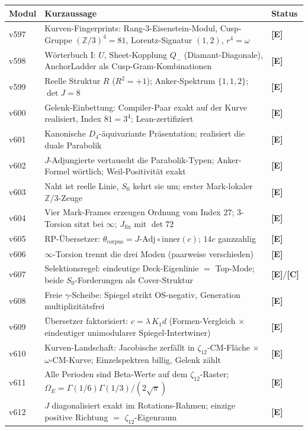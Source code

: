 \documentclass[11pt,a4paper]{article}
\newcommand{\E}{\textcolor{gut}{\textbf{[E]}}}
\newcommand{\C}{\textcolor{kern}{\textbf{[C]}}}
\begin{document}
\begingroup
\small
\setlength{\tabcolsep}{4pt}
\begin{longtable}{@{}l p{11.1cm} l@{}}
\toprule
\textbf{Modul} & \textbf{Kurzaussage} & \textbf{Status} \\
\midrule
\endhead
\bottomrule
\endfoot
v597 & Kurven-Fingerprints: Rang-3-Eisenstein-Modul, Cusp-Gruppe $(\mathbb{Z}/3)^4 = 81$, Lorentz-Signatur $(1,2)$, $r^4 = \omega$ & \E \\
v598 & Wörterbuch I: $U$, Sheet-Kopplung $Q_-$ (Diamant-Diagonale), AnchorLadder als Cusp-Gram-Kombinationen & \E \\
v599 & Reelle Struktur $R$ ($R^2 = +1$); Anker-Spektrum $\{1,1,2\}$; $\det J = 8$ & \E \\
v600 & Gelenk-Einbettung: Compiler-Paar exakt auf der Kurve realisiert, Index $81 = 3^4$; Lean-zertifiziert & \E \\
v601 & Kanonische $D_4$-äquivariante Präsentation; realisiert die duale Parabolik & \E \\
v602 & $J$-Adjungierte vertauscht die Parabolik-Typen; Anker-Formel wörtlich; Weil-Positivität exakt & \E \\
v603 & Naht ist reelle Linie, $S_0$ kehrt sie um; erster Mark-lokaler $\mathbb{Z}/3$-Zeuge & \E \\
v604 & Vier Mark-Frames erzeugen Ordnung vom Index $27$; 3-Torsion sitzt bei $\infty$; $J_{\mathrm{fix}}$ mit $\det 72$ & \E \\
v605 & RP-Übersetzer: $\theta_{\mathrm{corpus}} = J\text{-Adj} \circ \mathrm{inner}(c)$; $14c$ ganzzahlig & \E \\
v606 & $\infty$-Torsion trennt die drei Moden (paarweise verschieden) & \E \\
v607 & Selektionsregel: eindeutige Deck-Eigenlinie $=$ Top-Mode; beide $S_0$-Forderungen als Cover-Struktur & \E/\C \\
v608 & Freie $\gamma$-Scheibe: Spiegel strikt OS-negativ, Generation multiplizitätsfrei & \E \\
\midrule
v609 & Übersetzer faktorisiert: $c = \lambda\,K_1 d$ (Formen-Vergleich $\times$ eindeutiger unimodularer Spiegel-Intertwiner) & \E \\
v610 & Kurven-Landschaft: Jacobische zerfällt in $\zeta_{12}$-CM-Fläche $\times$ $\omega$-CM-Kurve; Einzelspektren billig, Gelenk zählt & \E \\
v611 & Alle Perioden sind Beta-Werte auf dem $\zeta_{12}$-Raster; $\Omega_E = \Gamma(1/6)\Gamma(1/3)/(2\sqrt{\pi})$ & \E \\
v612 & $J$ diagonalisiert exakt im Rotations-Rahmen; einzige positive Richtung $=$ $\zeta_{12}$-Eigenraum & \E \\

\end{longtable}
\end{document}
